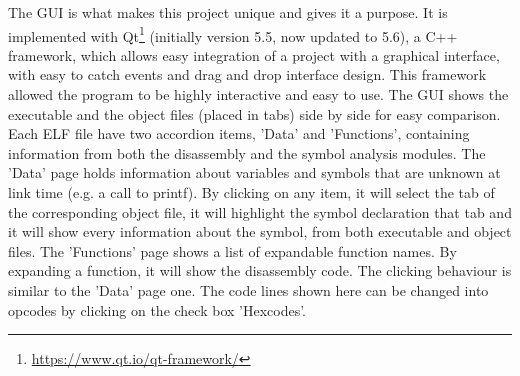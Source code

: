 The GUI is what makes this project unique and gives it a purpose. It is implemented with Qt\footnote{\url{https://www.qt.io/qt-framework/}} (initially version 5.5, now updated to 5.6), a C++ framework, which allows easy integration of a project with a graphical interface, with easy to catch events and drag and drop interface design. This framework allowed the program to be highly interactive and easy to use. The GUI shows the executable and the object files (placed in tabs) side by side for easy comparison. Each ELF file have two accordion items, 'Data' and 'Functions', containing information from both the disassembly and the symbol analysis modules. The 'Data' page holds information about variables and symbols that are unknown at link time (e.g. a call to printf). By clicking on any item, it will select the tab of the corresponding object file, it will highlight the symbol declaration that tab and it will show every information about the symbol, from both executable and object files. The 'Functions' page shows a list of expandable function names. By expanding a function, it will show the disassembly code. The clicking behaviour is similar to the 'Data' page one. The code lines shown here can be changed into opcodes by clicking on the check box 'Hexcodes'.
